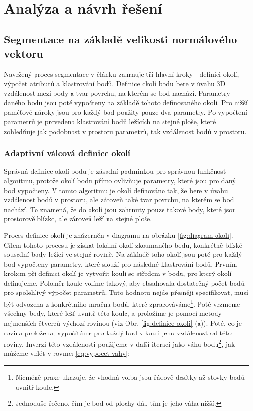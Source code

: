 \documentclass[11pt,twoside,a4paper]{book}
\begin{document}
\chapter{Analýza a návrh řešení}
\label{chap:analyza}

\section{Segmentace na základě velikosti normálového vektoru}

Navržený proces segmentace v článku \cite{Seg01} zahrnuje tři hlavní kroky - definici okolí, výpočet atributů a klastrování bodů. Definice okolí bodu bere v úvahu 3D vzdálenost mezi body a tvar povrchu, na kterém se bod nachází. Parametry daného bodu jsou poté vypočteny na základě tohoto definovaného okolí. Pro nižší paměťové nároky jsou pro každý bod použity pouze dva parametry. Po vypočtení parametrů je provedeno klastrování bodů ležících na stejné ploše, které zohledňuje jak podobnost v prostoru parametrů, tak vzdálenost bodů v prostoru.

\subsection{Adaptivní válcová definice okolí} 
\label{sub:def-okoli}

Správná definice okolí bodu je zásadní podmínkou pro správnou funkčnost algoritmu, protože okolí bodu přímo ovlivňuje parametry, které jsou pro daný bod vypočteny. V tomto algoritmu je okolí definováno tak, že bere v úvahu vzdálenost bodů v prostoru, ale zároveň také tvar povrchu, na kterém se bod nachází. To znamená, že do okolí jsou zahrnuty pouze takové body, které jsou prostorově blízko, ale zároveň leží na stejné ploše.

Proces definice okolí je znázorněn v diagramu na obrázku \ref{fig:diagram-okoli}. Cílem tohoto procesu je získat lokální okolí zkoumaného bodu, konkrétně blízké sousední body ležící ve stejné rovině. Na základě toho okolí jsou poté pro každý bod vypočteny parametry, které slouží pro následné klastrování bodů. Prvním krokem při definici okolí je vytvořit kouli se středem v bodu, pro který okolí definujeme. Poloměr koule volíme takový, aby obsahovala dostatečný počet bodů pro spolehlivý výpočet parametrů. Tuto hodnotu nejde přesněji specifikovat, musí být odvozena z konkrétního mračna bodů, které zpracováváme\footnote{Nicméně praxe ukazuje, že vhodná volba jsou řádově desítky až stovky bodů uvnitř koule.}. Poté vezmeme všechny body, které leží uvnitř této koule, a proložíme je pomocí metody nejmenších čtverců výchozí rovinou (viz Obr. \ref{fig:definice-okoli} (a)). Poté, co je rovina proložena, vypočítáme pro každý bod v kouli jeho vzdálenost od této roviny. Inverzi této vzdálenosti použijeme v další iteraci jako váhu bodu\footnote{Jednoduše řečeno, čím je bod od plochy dál, tím je jeho váha nižší.}, jak můžeme vidět v rovnici \ref{eq:vypocet-vahy}:
\end{document}
